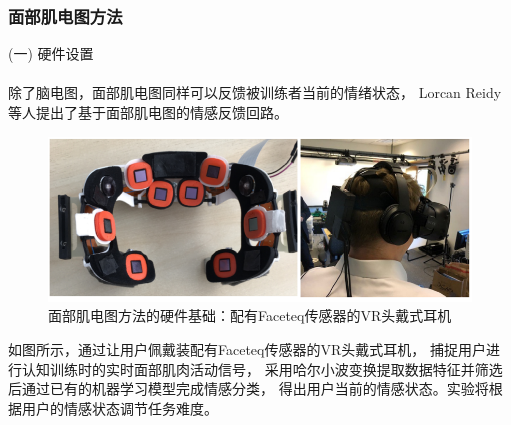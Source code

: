 \documentclass{article}
\begin{document}
            \subsubsection{面部肌电图方法}
            (一) 硬件设置\paragraph{}
            除了脑电图，面部肌电图同样可以反馈被训练者当前的情绪状态，
            Lorcan Reidy\cite{ref15}等人提出了基于面部肌电图的情感反馈回路。
            \begin{figure}[H]
            	
            	\centering
            	\includegraphics[scale=0.8]{images/Faceteq.png}
            	\caption{面部肌电图方法的硬件基础：配有Faceteq传感器的VR头戴式耳机\cite{ref15}}
            	\label{fig:label}
            \end{figure}
            如图所示，通过让用户佩戴装配有Faceteq传感器的VR头戴式耳机，
            捕捉用户进行认知训练时的实时面部肌肉活动信号，
            采用哈尔小波变换提取数据特征并筛选后通过已有的机器学习模型完成情感分类，
            得出用户当前的情感状态。实验将根据用户的情感状态调节任务难度。
\end{document}
